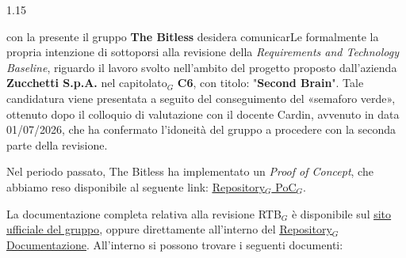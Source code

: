 \documentclass[a4paper, 11pt]{article}
\let\orighref\href
\renewcommand{\href}[2]{\orighref{#1}{\uline{#2}}}
\begin{document}
\vspace{0.4cm}
\begin{spacing}{1.15}

\noindent con la presente il gruppo \textbf{The Bitless} desidera comunicarLe formalmente la propria intenzione di sottoporsi alla revisione della \textit{Requirements and Technology Baseline}, riguardo il lavoro svolto nell'ambito del progetto proposto dall'azienda \textbf{Zucchetti S.p.A.} nel capitolato$_G$ \textbf{C6}, con titolo: "\textbf{Second Brain}". Tale candidatura viene presentata a seguito del conseguimento del «semaforo verde», ottenuto dopo il colloquio di valutazione con il docente Cardin, avvenuto in data 01/07/2026, che ha confermato l'idoneità del gruppo a procedere con la seconda parte della revisione.

\noindent Nel periodo passato, The Bitless ha implementato un \textit{Proof of Concept}, che abbiamo reso disponibile al seguente link: \href{https://github.com/thebitless-group-swe/PoC}{Repository$_G$ PoC$_G$}.

\vspace{0.2cm}

\noindent La documentazione completa relativa alla revisione RTB$_G$ è disponibile sul \href{https://thebitless.live}{sito ufficiale del gruppo}, oppure direttamente all'interno del \href{https://github.com/thebitless-group-swe/thebitless.github.io}{Repository$_G$ Documentazione}. All'interno si possono trovare i seguenti documenti:


\end{spacing}
\end{document}
